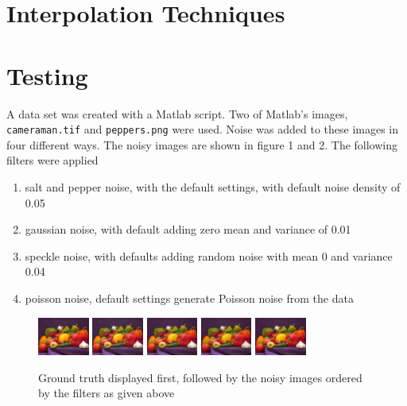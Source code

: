 \documentclass{article}
\begin{document}
\section{Interpolation Techniques}
\label{sec:interp-techs}
% 
\section{Testing}
\label{sec:test}
A data set was created with a Matlab script. Two of Matlab's images,
\texttt{cameraman.tif} and \texttt{peppers.png} were used. Noise was
added to these images in four different ways. The noisy images are
shown in figure 1 and 2. The following filters
were applied
\begin{enumerate}
  \item salt and pepper noise, with the default settings, with
  default noise density of 0.05
  \item gaussian noise, with default adding zero mean and variance
  of 0.01 
  \item speckle noise, with defaults adding random noise with mean 0
  and variance 0.04 
  \item poisson noise, default settings generate Poisson noise from
  the data
\end{enumerate}
%
\begin{figure}[H]
  \centering
  \includegraphics[width=0.15\textwidth]{images/peps_truth}
  \includegraphics[width=0.15\textwidth]{images/peps_noisy1}
  \includegraphics[width=0.15\textwidth]{images/peps_noisy2}
  \includegraphics[width=0.15\textwidth]{images/peps_noisy3}
  \includegraphics[width=0.15\textwidth]{images/peps_noisy4}
  \caption{Ground truth displayed first, followed by the noisy images
    ordered by the filters as given above}
\end{figure}
\end{document}
